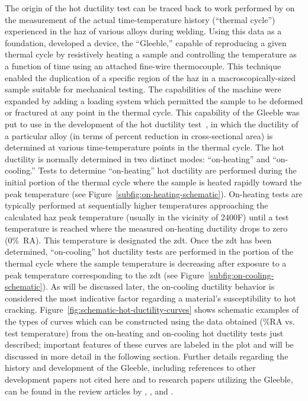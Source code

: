 The origin of the hot ductility test can be traced back to work performed by \citet{nippes_cooling_1949} on the measurement of the actual time-temperature history (“thermal cycle”) experienced in the \gls{haz} of various alloys during welding.  Using this data as a foundation, \citet{nippes_development_1949} developed a device, the “Gleeble,” capable of reproducing a given thermal cycle by resistively heating a sample and controlling the temperature as a function of time using an attached fine-wire thermocouple. This technique enabled the duplication of a specific region of the \gls{haz} in a macroscopically-sized sample suitable for mechanical testing.  The capabilities of the machine were expanded by adding a loading system which permitted the sample to be deformed or fractured at any point in the thermal cycle.  This capability of the Gleeble\textregistered{} was put to use in the development of the hot ductility test~\cite{nippes_investigation_1955}, in which the ductility of a particular alloy (in terms of percent reduction in cross-sectional area) is determined at various time-temperature points in the thermal cycle.  The hot ductility is normally determined in two distinct modes: “on-heating” and “on-cooling.”  Tests to determine “on-heating” hot ductility are performed during the initial portion of the thermal cycle where the sample is heated rapidly toward the peak temperature (see Figure~\ref{subfig:on-heating-schematic}).  On-heating tests are typically performed at sequentially higher temperatures approaching the calculated \gls{haz} peak temperature (usually in the vicinity of 2400\textdegree{}F) until a test temperature is reached where the measured on-heating ductility drops to zero (0\%~RA).  This temperature is designated the \gls{zdt}.  Once the \gls{zdt} has been determined, “on-cooling” hot ductility tests are performed in the portion of the thermal cycle where the sample temperature is decreasing after exposure to a peak temperature corresponding to the \gls{zdt} (see Figure~\ref{subfig:on-cooling-schematic}).  As will be discussed later, the on-cooling ductility behavior is considered the most indicative factor regarding a material’s susceptibility to hot cracking.  Figure~\ref{fig:schematic-hot-ductility-curves} shows schematic examples of the types of curves which can be constructed using the data obtained (\%RA vs. test temperature) from the on-heating and on-cooling hot ductility tests just described; important features of these curves are labeled in the plot and will be discussed in more detail in the following section. Further details regarding the history and development of the Gleeble, including references to other development papers not cited here and to research papers utilizing the Gleeble, can be found in the review articles by \citet{savage_apparatus_1962}, \citet{lundin_historical_1997}, and \citet{lundin_standardization_1990_history}. 

